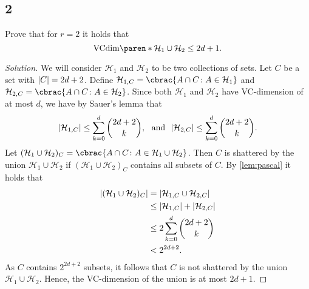 \documentclass[10pt, a4paper, twoside]{amsart}
\theoremstyle{plain}
\DeclarePairedDelimiter\abs{\lvert}{\rvert}
\DeclarePairedDelimiter\cbrac\{\}
\DeclarePairedDelimiter\paren()
\renewcommand{\c}{\ensuremath{\colon}}
\newcommand{\cH}{\ensuremath{\mathcal{H}}}
\newenvironment{solution}
               {\let\oldqedsymbol=\qedsymbol
                \renewcommand{\qedsymbol}{$\blacktriangleleft$}
                \begin{proof}[Solution]}
               {\end{proof}
                \renewcommand{\qedsymbol}{\oldqedsymbol}}
\begin{document}
\subsection*{2}
Prove that for $r = 2$ it holds that
\begin{equation*}
  \text{VCdim}\paren*{\cH_1 \cup \cH_2}\leq 2d +1.
\end{equation*}
\begin{solution}
We will consider $\cH_1$ and $\cH_2$ to be two collections of sets.
Let $C$ be a set with $\abs{C}=2d+2$. Define $\cH_{1,C}=\cbrac{A \cap C \c A \in \cH_1}$
and $\cH_{2,C}=\cbrac{A \cap C \c A \in \cH_2}$. 
Since both $\cH_1$ and $\cH_2$ have VC-dimension of at most $d$, we have by Sauer's lemma that 
\begin{equation*}
 \abs{\cH_{1,C}} \leq \sum_{k=0}^{d}\binom{2d+2}{k}, \ \text{ and } \ \abs{\cH_{2,C}} \leq \sum_{k=0}^{d}\binom{2d+2}{k}.
\end{equation*}
Let $(\cH_{1}\cup \cH_{2})_C=\cbrac{A \cap C \c A \in \cH_1 \cup \cH_2}$. Then $C$ is shattered by the union $\cH_1 \cup \cH_2$
if $(\cH_{1}\cup \cH_{2})_C$ contains all subsets of $C$.
By \cref{lem:pascal} it holds that
\begin{align*}
 \abs{(\cH_{1}\cup \cH_{2})_C} &= \abs{\cH_{1,C} \cup \cH_{2,C}} \\
 &\leq \abs{\cH_{1,C}} + \abs{\cH_{2,C}} \\
 &\leq 2\sum_{k=0}^{d}\binom{2d+2}{k} \\
 &< 2^{2d+2}.
\end{align*}
As $C$ contains $2^{2d+2}$ subsets, it follows that $C$ is not shattered by the union $\cH_1 \cup \cH_2$.
Hence, the VC-dimension of the union is at most $2d+1$.
\end{solution}
\end{document}
